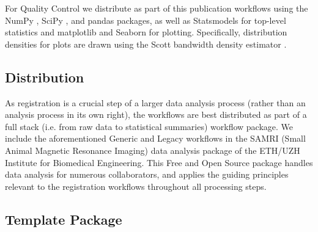 For Quality Control we distribute as part of this publication workflows using the NumPy \cite{numpy}, SciPy \cite{scipy}, and pandas \cite{pandas} packages, as well as Statsmodels \cite{statsmodels} for top-level statistics and matplotlib \cite{matplotlib} and Seaborn \cite{seaborn} for plotting.
Specifically, distribution densities for plots are drawn using the Scott bandwidth density estimator \cite{Scott1979}.


\subsection{Distribution}

As registration is a crucial step of a larger data analysis process (rather than an analysis process in its own right), the workflows are best distributed as part of a full stack (i.e. from raw data to statistical summaries) workflow package.
We include the aforementioned Generic and Legacy workflows in the SAMRI (Small Animal Magnetic Resonance Imaging) data analysis package \cite{samri} of the ETH/UZH Institute for Biomedical Engineering.
This Free and Open Source package handles data analysis for numerous collaborators, and applies the guiding principles relevant to the registration workflows throughout all processing steps.

\subsection{Template Package}


